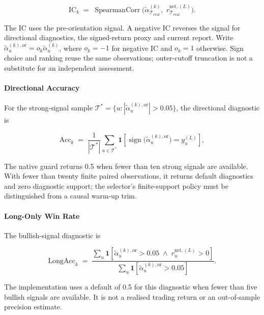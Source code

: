 \begin{equation}
    \mathrm{IC}_k \;=\;
    \operatorname{SpearmanCorr}\!\bigl(
        \tilde{\alpha}^{(k)}_{\mathcal{T}_{\mathrm{eval}}},\;
        r^{\mathrm{net},(L)}_{\mathcal{T}_{\mathrm{eval}}}
    \bigr).
    \label{eq:ic}
\end{equation}


The IC uses the pre-orientation signal. A negative IC reverses the signal for directional diagnostics, the signed-return proxy and current report. Write $\tilde{\alpha}^{(k),\mathrm{or}}_u=o_k\tilde{\alpha}^{(k)}_u$, where $o_k=-1$ for negative IC and $o_k=1$ otherwise. Sign choice and ranking reuse the same observations; outer-cutoff truncation is not a substitute for an independent assessment.

\paragraph{Directional Accuracy}
For the strong-signal sample $\mathcal{T}^{*}=\{u:|\tilde{\alpha}^{(k),\mathrm{or}}_u|>0.05\}$, the directional diagnostic is

\begin{equation}
    \mathrm{Acc}_k \;=\;
    \frac{1}{|\mathcal{T}^*|}
    \sum_{u \in \mathcal{T}^*}
    \mathbf{1}\!\left[
        \operatorname{sign}\!\bigl(\tilde{\alpha}^{(k),\mathrm{or}}_u\bigr)
        = y^{(L)}_u
    \right],
\end{equation}


The native guard returns 0.5 when fewer than ten strong signals are available. With fewer than twenty finite paired observations, it returns default diagnostics and zero diagnostic support; the selector's finite-support policy must be distinguished from a causal warm-up trim.

\paragraph{Long-Only Win Rate}
The bullish-signal diagnostic is

\begin{equation}
    \mathrm{LongAcc}_k \;=\;
    \frac{
        \sum_u \mathbf{1}\!\left[
            \tilde{\alpha}^{(k),\mathrm{or}}_u > 0.05 \;\wedge\; r^{\mathrm{net},(L)}_u > 0
        \right]
    }{
        \sum_u \mathbf{1}\!\left[
            \tilde{\alpha}^{(k),\mathrm{or}}_u > 0.05
        \right]
    }.
\end{equation}


The implementation uses a default of 0.5 for this diagnostic when fewer than five bullish signals are available. It is not a realised trading return or an out-of-sample precision estimate.

